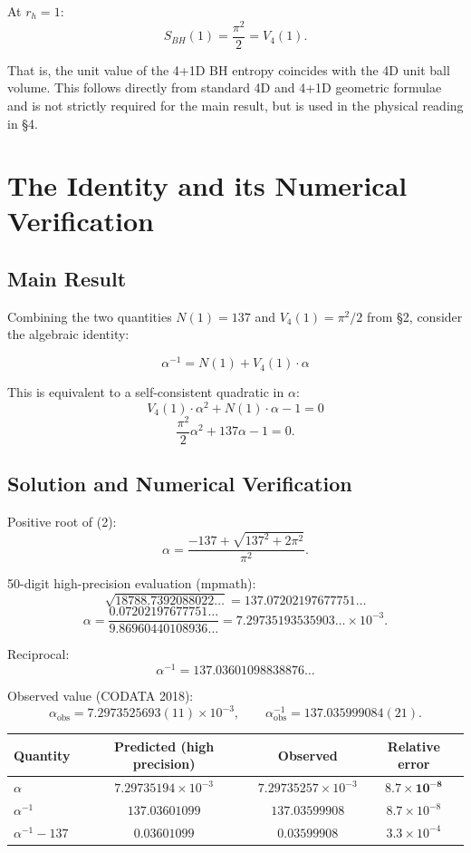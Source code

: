 \documentclass[a4paper,11pt]{article}
\begin{document}
At $r_h = 1$:
\[ S_{BH}(1) = \frac{\pi^2}{2} = V_4(1). \]

That is, the unit value of the 4+1D BH entropy coincides with the 4D unit ball volume. This follows directly from standard 4D and 4+1D geometric formulae and is not strictly required for the main result, but is used in the physical reading in §4.

\section{The Identity and its Numerical Verification}

\subsection{Main Result}

Combining the two quantities $N(1) = 137$ and $V_4(1) = \pi^2/2$ from §2, consider the algebraic identity:

\begin{equation}
\boxed{\; \alpha^{-1} = N(1) + V_4(1) \cdot \alpha \;} \tag{1}
\end{equation}

This is equivalent to a self-consistent quadratic in $\alpha$:
\begin{equation}
V_4(1) \cdot \alpha^2 + N(1) \cdot \alpha - 1 = 0 \tag{2}
\end{equation}
\[ \frac{\pi^2}{2}\alpha^2 + 137 \alpha - 1 = 0. \]

\subsection{Solution and Numerical Verification}

Positive root of (2):
\[ \alpha = \frac{-137 + \sqrt{137^2 + 2\pi^2}}{\pi^2}. \]

50-digit high-precision evaluation (mpmath):
\[ \sqrt{18788.7392088022\ldots} = 137.07202197677751\ldots \]
\[ \alpha = \frac{0.07202197677751\ldots}{9.86960440108936\ldots} = 7.29735193535903\ldots \times 10^{-3}. \]

Reciprocal:
\[ \alpha^{-1} = 137.03601098838876\ldots \]

Observed value (CODATA 2018):
\[ \alpha_{\text{obs}} = 7.2973525693(11) \times 10^{-3}, \qquad \alpha_{\text{obs}}^{-1} = 137.035999084(21). \]

\begin{center}
\begin{tabular}{lccc}
\toprule
Quantity & Predicted (high precision) & Observed & Relative error \\
\midrule
$\alpha$ & $7.29735194 \times 10^{-3}$ & $7.29735257 \times 10^{-3}$ & $\mathbf{8.7 \times 10^{-8}}$ \\
$\alpha^{-1}$ & $137.03601099$ & $137.03599908$ & $8.7 \times 10^{-8}$ \\
$\alpha^{-1} - 137$ & $0.03601099$ & $0.03599908$ & $3.3 \times 10^{-4}$ \\
\bottomrule
\end{tabular}
\end{center}
\end{document}
